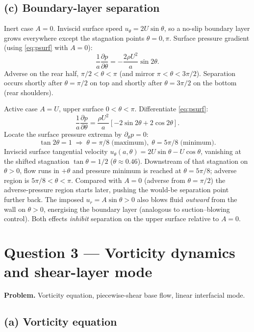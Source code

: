 \documentclass[11pt]{article}
\newcommand{\pd}[2]{\frac{\partial #1}{\partial #2}}
\begin{document}
\subsection*{(c) Boundary-layer separation}

Inert case $A=0$. Inviscid surface speed $u_\theta=2U\sin\theta$, so a no-slip boundary layer grows everywhere except the stagnation points $\theta=0,\pi$. Surface pressure gradient (using \eqref{eq:psurf} with $A=0$):
\[
\frac{1}{a}\pd{p}{\theta}=-\frac{2\rho U^2}{a}\sin 2\theta.
\]
Adverse on the rear half, $\pi/2<\theta<\pi$ (and mirror $\pi<\theta<3\pi/2$). Separation occurs shortly after $\theta=\pi/2$ on top and shortly after $\theta=3\pi/2$ on the bottom (rear shoulders).

Active case $A=U$, upper surface $0<\theta<\pi$. Differentiate \eqref{eq:psurf}:
\[
\frac{1}{a}\pd{p}{\theta}=\frac{\rho U^2}{a}\!\left[-2\sin 2\theta+2\cos 2\theta\right].
\]
Locate the surface pressure extrema by $\partial_\theta p=0$:
\[
\tan 2\theta=1\;\Rightarrow\;\theta=\pi/8\;\text{(maximum)},\;\theta=5\pi/8\;\text{(minimum)}.
\]
Inviscid surface tangential velocity $u_\theta(a,\theta)=2U\sin\theta-U\cos\theta$, vanishing at the shifted stagnation $\tan\theta=1/2$ ($\theta\approx 0.46$). Downstream of that stagnation on $\theta>0$, flow runs in $+\theta$ and pressure minimum is reached at $\theta=5\pi/8$; adverse region is $5\pi/8<\theta<\pi$. Compared with $A=0$ (adverse from $\theta=\pi/2$) the adverse-pressure region starts later, pushing the would-be separation point further back. The imposed $u_r=A\sin\theta>0$ also blows fluid \emph{outward} from the wall on $\theta>0$, energising the boundary layer (analogous to suction--blowing control). Both effects \emph{inhibit} separation on the upper surface relative to $A=0$.

\section*{Question 3 --- Vorticity dynamics and shear-layer mode}

\textbf{Problem.} Vorticity equation, piecewise-shear base flow, linear interfacial mode.

\subsection*{(a) Vorticity equation}
\end{document}
